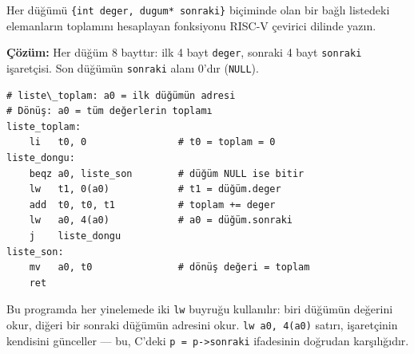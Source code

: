 \begin{ornek}[4.13]
\label{orn:bagli-liste}
Her düğümü \texttt{\{int deger, dugum* sonraki\}} biçiminde olan bir bağlı listedeki elemanların toplamını hesaplayan fonksiyonu RISC-V çevirici dilinde yazın.

\textbf{Çözüm:} Her düğüm 8 bayttır: ilk 4 bayt \texttt{deger}, sonraki 4 bayt \texttt{sonraki} işaretçisi. Son düğümün \texttt{sonraki} alanı 0'dır (\texttt{NULL}).

\begin{lstlisting}[style=riscv]
# liste\_toplam: a0 = ilk düğümün adresi
# Dönüş: a0 = tüm değerlerin toplamı
liste_toplam:
    li   t0, 0                # t0 = toplam = 0
liste_dongu:
    beqz a0, liste_son        # düğüm NULL ise bitir
    lw   t1, 0(a0)            # t1 = düğüm.deger
    add  t0, t0, t1           # toplam += deger
    lw   a0, 4(a0)            # a0 = düğüm.sonraki
    j    liste_dongu
liste_son:
    mv   a0, t0               # dönüş değeri = toplam
    ret
\end{lstlisting}

Bu programda her yinelemede iki \texttt{lw} buyruğu kullanılır: biri düğümün değerini okur, diğeri bir sonraki düğümün adresini okur. \texttt{lw a0, 4(a0)} satırı, işaretçinin kendisini günceller --- bu, C'deki \texttt{p = p->sonraki} ifadesinin doğrudan karşılığıdır.
\end{ornek}

